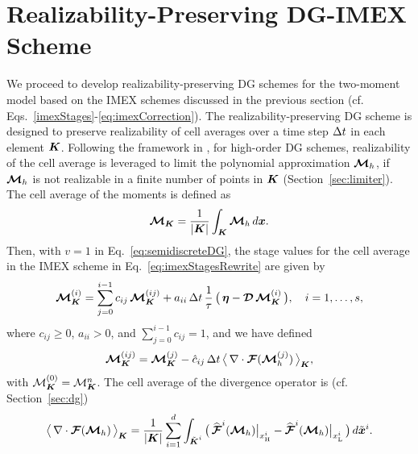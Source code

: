 \section{Realizability-Preserving DG-IMEX Scheme}
\label{sec:realizableDGIMEX}

We proceed to develop realizability-preserving DG schemes for the two-moment model based on the IMEX schemes discussed in the previous section (cf. Eqs.~\eqref{imexStages}-\eqref{eq:imexCorrection}).  
The realizability-preserving DG scheme is designed to preserve realizability of cell averages over a time step $\Delta t$ in each element $\boldsymbol{K}$.  
Following the framework in \cite{zhangShu_2010b}, for high-order DG schemes, realizability of the cell average is leveraged to limit the polynomial approximation $\boldsymbol{\mathcal{M}}_{h}$, if $\boldsymbol{\mathcal{M}}_{h}$ is not realizable in a finite number of points in $\boldsymbol{K}$ (Section~\ref{sec:limiter}).  
The cell average of the moments is defined as
\begin{equation}
  \boldsymbol{\mathcal{M}}_{\boldsymbol{K}}
  =\frac{1}{|\boldsymbol{K}|}\int_{\boldsymbol{K}}\boldsymbol{\mathcal{M}}_{h}\,d\boldsymbol{x}.  
\end{equation}
Then, with $v=1$ in Eq.~\eqref{eq:semidiscreteDG}, the stage values for the cell average in the IMEX scheme in Eq.~\eqref{eq:imexStagesRewrite} are given by
\begin{equation}
  \boldsymbol{\mathcal{M}}_{\boldsymbol{K}}^{(i)}
  =\sum_{j=0}^{i-1}c_{ij}\,\boldsymbol{\mathcal{M}}_{\boldsymbol{K}}^{(ij)}
  +a_{ii}\,\Delta t\,\frac{1}{\tau}\,\big(\,\boldsymbol{\eta}-\boldsymbol{\mathcal{D}}\,\boldsymbol{\mathcal{M}}_{\boldsymbol{K}}^{(i)}\,\big), \quad i=1,\ldots,s,
  \label{eq:imexStagesCellAverage}
\end{equation}
where $c_{ij}\ge0$, $a_{ii}>0$, and $\sum_{j=0}^{i-1}c_{ij}=1$, and we have defined
\begin{equation}
  \boldsymbol{\mathcal{M}}_{\boldsymbol{K}}^{(ij)}
  =\boldsymbol{\mathcal{M}}_{\boldsymbol{K}}^{(j)}-\hat{c}_{ij}\,\Delta t\,\big\langle\,\nabla\cdot\boldsymbol{\mathcal{F}}(\boldsymbol{\mathcal{M}}_{h}^{(j)})\,\big\rangle_{\boldsymbol{K}},
\end{equation}
with $\mathcal{M}_{\boldsymbol{K}}^{(0)}=\mathcal{M}_{\boldsymbol{K}}^{n}$.  
The cell average of the divergence operator is (cf. Section~\ref{sec:dg})
\begin{equation}
  \big\langle\,\nabla\cdot\boldsymbol{\mathcal{F}}(\boldsymbol{\mathcal{M}}_{h})\,\big\rangle_{\boldsymbol{K}}
  =\frac{1}{|\boldsymbol{K}|}\sum_{i=1}^{d}\int_{\tilde{\boldsymbol{K}}^{i}}
  \big(\,\widehat{\boldsymbol{\mathcal{F}}}^{i}(\boldsymbol{\mathcal{M}}_{h})\big|_{x_{\mbox{\tiny H}}^{i}}-\widehat{\boldsymbol{\mathcal{F}}}^{i}(\boldsymbol{\mathcal{M}}_{h})\big|_{x_{\mbox{\tiny L}}^{i}}\,\big)\,d\tilde{\boldsymbol{x}}^{i}.  
\end{equation}

